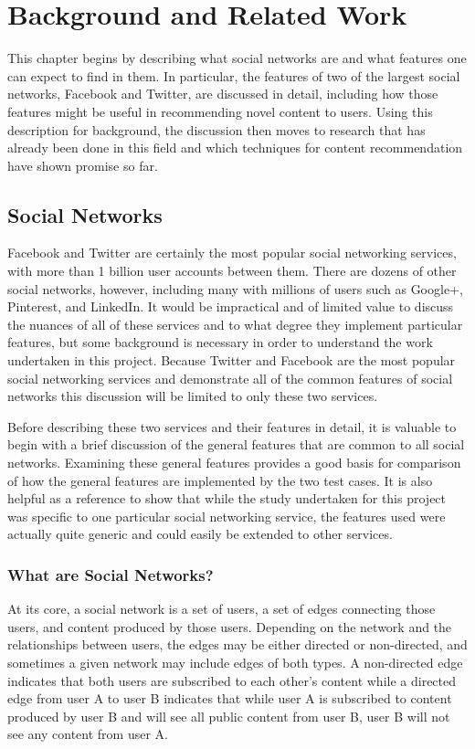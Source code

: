 \chapter{Background and Related Work}

This chapter begins by describing what social networks are and what features one can expect to find in them. In particular, the features of two of the largest social networks, Facebook and Twitter, are discussed in detail, including how those features might be useful in recommending novel content to users. Using this description for background, the discussion then moves to research that has already been done in this field and which techniques for content recommendation have shown promise so far.

\section{Social Networks}

Facebook and Twitter are certainly the most popular social networking services, with more than 1 billion user accounts between them. There are dozens of other social networks, however, including many with millions of users such as Google+, Pinterest, and LinkedIn. It would be impractical and of limited value to discuss the nuances of all of these services and to what degree they implement particular features, but some background is necessary in order to understand the work undertaken in this project. Because Twitter and Facebook are the most popular social networking services and demonstrate all of the common features of social networks this discussion will be limited to only these two services.

Before describing these two services and their features in detail, it is valuable to begin with a brief discussion of the general features that are common to all social networks. Examining these general features provides a good basis for comparison of how the general features are implemented by the two test cases. It is also helpful as a reference to show that while the study undertaken for this project was specific to one particular social networking service, the features used were actually quite generic and could easily be extended to other services.


\subsection{What are Social Networks?}

At its core, a social network is a set of users, a set of edges connecting those users, and content produced by those users. Depending on the network and the relationships between users, the edges may be either directed or non-directed, and sometimes a given network may include edges of both types. A non-directed edge indicates that both users are subscribed to each other's content while a directed edge from user A to user B indicates that while user A is subscribed to content produced by user B and will see all public content from user B, user B will not see any content from user A.

